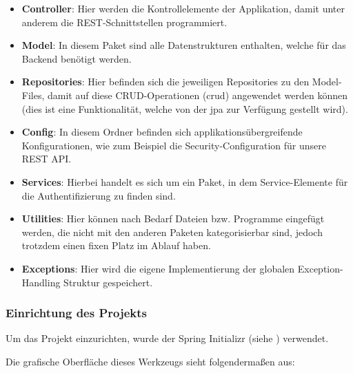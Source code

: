 \begin{itemize}
	\item \textbf{Controller}: Hier werden die Kontrollelemente der Applikation, damit unter anderem die REST-Schnittstellen programmiert.
	\item \textbf{Model}: In diesem Paket sind alle Datenstrukturen enthalten, welche für das Backend benötigt werden.
	\item \textbf{Repositories}: Hier befinden sich die jeweiligen Repositories zu den Model-Files, damit auf diese CRUD-Operationen (\gls{crud}) angewendet werden können (dies ist eine Funktionalität, welche von der \gls{jpa} zur Verfügung gestellt wird).
	\item \textbf{Config}: In diesem Ordner befinden sich applikationsübergreifende Konfigurationen, wie zum Beispiel die Security-Configuration für unsere REST API.
	\item \textbf{Services}: Hierbei handelt es sich um ein Paket, in dem Service-Elemente für die Authentifizierung zu finden sind.
	\item \textbf{Utilities}: Hier können nach Bedarf Dateien bzw. Programme eingefügt werden, die nicht mit den anderen Paketen kategorisierbar sind, jedoch trotzdem einen fixen Platz im Ablauf haben.
	\item \textbf{Exceptions}: Hier wird die eigene Implementierung der globalen Exception-Handling Struktur gespeichert.
\end{itemize}

\subsubsection{Einrichtung des Projekts}

Um das Projekt einzurichten, wurde der Spring Initializr (siehe \cite{website-spring-initializr}) verwendet. 

Die grafische Oberfläche dieses Werkzeugs sieht folgendermaßen aus:


